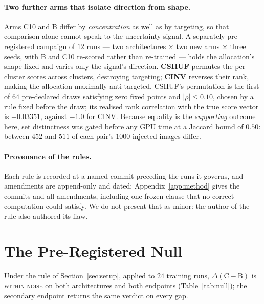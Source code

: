 \documentclass{article} %
\begin{document}
\paragraph{Two further arms that isolate direction from shape.} Arms C10 and B differ by
\emph{concentration} as well as by targeting, so that comparison alone cannot speak to the
uncertainty signal. A separately pre-registered campaign of $12$ runs --- two architectures $\times$
two new arms $\times$ three seeds, with B and C10 re-scored rather than re-trained --- holds the
allocation's shape fixed and varies only the signal's direction. \textbf{CSHUF} permutes the
per-cluster scores across clusters, destroying targeting; \textbf{CINV} reverses their rank, making
the allocation maximally anti-targeted. CSHUF's permutation is the first of $64$ pre-declared draws
satisfying zero fixed points and $|\rho| \leq 0.10$, chosen by a rule fixed before the draw; its
realised rank correlation with the true score vector is $-0.03351$, against $-1.0$ for CINV. Because
equality is the \emph{supporting} outcome here, set distinctness was gated before any GPU time at a
Jaccard bound of $0.50$: between $452$ and $511$ of each pair's $1000$ injected images differ.

\paragraph{Provenance of the rules.} Each rule is recorded at a named commit preceding the runs it
governs, and amendments are append-only and dated; Appendix~\ref{app:method} gives the commits and all
amendments, including one frozen clause that no correct computation could satisfy. We do not present
that as minor: the author of the rule also authored its flaw.

\section{The Pre-Registered Null}
\label{sec:null}

Under the rule of Section~\ref{sec:setup}, applied to $24$ training runs,
$\Delta(\mathrm{C}-\mathrm{B})$ is \textsc{within noise} on both architectures and both endpoints
(Table~\ref{tab:null}); the secondary endpoint returns the same verdict on every gap.
\end{document}
